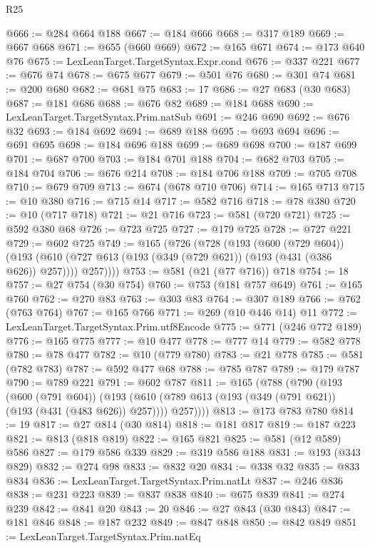 \begin{lexlean}{R25}
\begin{coremodule}
@666 := @284 @664 @188
@667 := @184 @666
@668 := @317 @189
@669 := @667 @668
@671 := @655 (@660 @669)
@672 := @165 @671
@674 := @173 @640 @76
@675 := LexLeanTarget.TargetSyntax.Expr.cond
@676 := @337 @221
@677 := @676 @74
@678 := @675 @677
@679 := @501 @76
@680 := @301 @74
@681 := @200 @680
@682 := @681 @75
@683 := 17
@686 := @27 @683 (@30 @683)
@687 := @181 @686
@688 := @676 @82
@689 := @184 @688
@690 := LexLeanTarget.TargetSyntax.Prim.natSub
@691 := @246 @690
@692 := @676 @32
@693 := @184 @692
@694 := @689 @188
@695 := @693 @694
@696 := @691 @695
@698 := @184 @696 @188
@699 := @689 @698
@700 := @187 @699
@701 := @687 @700
@703 := @184 @701 @188
@704 := @682 @703
@705 := @184 @704
@706 := @676 @214
@708 := @184 @706 @188
@709 := @705 @708
@710 := @679 @709
@713 := @674 (@678 @710 @706)
@714 := @165 @713
@715 := @10 @380
@716 := @715 @14
@717 := @582 @716
@718 := @78 @380
@720 := @10 (@717 @718)
@721 := @21 @716
@723 := @581 (@720 @721)
@725 := @592 @380 @68
@726 := @723 @725
@727 := @179 @725
@728 := @727 @221
@729 := @602 @725
@749 := @165
    (@726
      (@728
        (@193
          (@600 (@729 @604))
          (@193 (@610 (@727 @613 (@193 (@349 (@729 @621)) (@193 (@431 (@386 @626)) @257)))) @257))))
@753 := @581 (@21 (@77 @716)) @718
@754 := 18
@757 := @27 @754 (@30 @754)
@760 := @753 (@181 @757 @649)
@761 := @165 @760
@762 := @270 @83
@763 := @303 @83
@764 := @307 @189
@766 := @762 (@763 @764)
@767 := @165 @766
@771 := @269 (@10 @446 @14) @11
@772 := LexLeanTarget.TargetSyntax.Prim.utf8Encode
@775 := @771 (@246 @772 @189)
@776 := @165 @775
@777 := @10 @477
@778 := @777 @14
@779 := @582 @778
@780 := @78 @477
@782 := @10 (@779 @780)
@783 := @21 @778
@785 := @581 (@782 @783)
@787 := @592 @477 @68
@788 := @785 @787
@789 := @179 @787
@790 := @789 @221
@791 := @602 @787
@811 := @165
    (@788
      (@790
        (@193
          (@600 (@791 @604))
          (@193 (@610 (@789 @613 (@193 (@349 (@791 @621)) (@193 (@431 (@483 @626)) @257)))) @257))))
@813 := @173 @783 @780
@814 := 19
@817 := @27 @814 (@30 @814)
@818 := @181 @817
@819 := @187 @223
@821 := @813 (@818 @819)
@822 := @165 @821
@825 := @581 (@12 @589) @586
@827 := @179 @586 @339
@829 := @319 @586 @188
@831 := @193 (@343 @829)
@832 := @274 @98
@833 := @832 @20
@834 := @338 @32
@835 := @833 @834
@836 := LexLeanTarget.TargetSyntax.Prim.natLt
@837 := @246 @836
@838 := @231 @223
@839 := @837 @838
@840 := @675 @839
@841 := @274 @239
@842 := @841 @20
@843 := 20
@846 := @27 @843 (@30 @843)
@847 := @181 @846
@848 := @187 @232
@849 := @847 @848
@850 := @842 @849
@851 := LexLeanTarget.TargetSyntax.Prim.natEq

\end{coremodule}
\end{lexlean}
